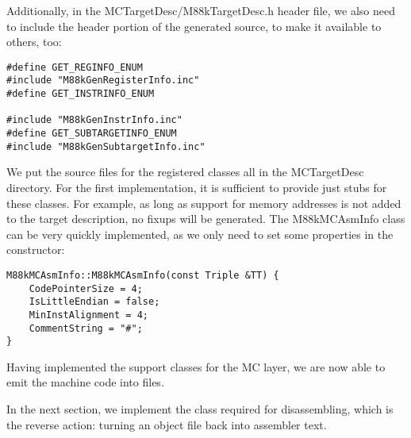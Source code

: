 Additionally, in the MCTargetDesc/M88kTargetDesc.h header file, we also need to include the header portion of the generated source, to make it available to others, too:\par

\begin{lstlisting}[caption={}]
#define GET_REGINFO_ENUM
#include "M88kGenRegisterInfo.inc"
#define GET_INSTRINFO_ENUM

#include "M88kGenInstrInfo.inc"
#define GET_SUBTARGETINFO_ENUM
#include "M88kGenSubtargetInfo.inc"
\end{lstlisting}

We put the source files for the registered classes all in the MCTargetDesc directory. For the first implementation, it is sufficient to provide just stubs for these classes. For example, as long as support for memory addresses is not added to the target description, no fixups will be generated. The M88kMCAsmInfo class can be very quickly implemented, as we only need to set some properties in the constructor:\par

\begin{lstlisting}[caption={}]
M88kMCAsmInfo::M88kMCAsmInfo(const Triple &TT) {
	CodePointerSize = 4;
	IsLittleEndian = false;
	MinInstAlignment = 4;
	CommentString = "#";
}
\end{lstlisting}

Having implemented the support classes for the MC layer, we are now able to emit the machine code into files.\par

In the next section, we implement the class required for disassembling, which is the reverse action: turning an object file back into assembler text.\par
























